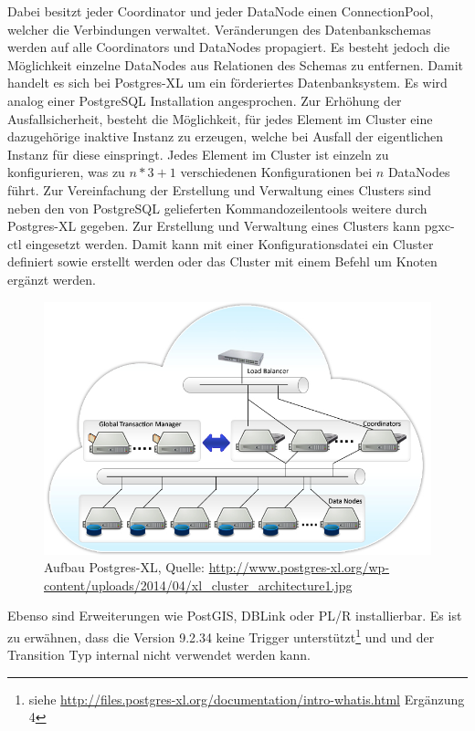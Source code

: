 Dabei besitzt jeder Coordinator und jeder DataNode einen ConnectionPool, welcher die Verbindungen verwaltet.
Veränderungen des Datenbankschemas werden auf alle Coordinators und DataNodes propagiert.
Es besteht jedoch die Möglichkeit einzelne DataNodes aus Relationen des Schemas zu entfernen.
Damit handelt es sich bei Postgres-XL um ein förderiertes Datenbanksystem.
Es wird analog einer PostgreSQL Installation angesprochen.
Zur Erhöhung der Ausfallsicherheit, besteht die Möglichkeit, für jedes Element im Cluster eine dazugehörige inaktive Instanz zu erzeugen, welche bei Ausfall der eigentlichen Instanz für diese einspringt.
Jedes Element im Cluster ist einzeln zu konfigurieren, was zu $ n*3+1 $ verschiedenen Konfigurationen bei $n$ DataNodes führt.
Zur Vereinfachung der Erstellung und Verwaltung eines Clusters sind neben den von PostgreSQL gelieferten Kommandozeilentools weitere durch Postgres-XL gegeben.
Zur Erstellung und Verwaltung eines Clusters kann pgxc-ctl eingesetzt werden.
Damit kann mit einer Konfigurationsdatei ein Cluster definiert sowie erstellt werden oder das Cluster mit einem Befehl um Knoten ergänzt werden.
\begin{figure}[h!]
\centering
\includegraphics[width=.7\textwidth]{Abbildungen/postgresxl-structure.jpg}
\caption[Aufbau Postgres-XL]{Aufbau Postgres-XL, Quelle: \url{http://www.postgres-xl.org/wp-content/uploads/2014/04/xl_cluster_architecture1.jpg}}
\label{fig:postgresxl}
\end{figure}
Ebenso sind Erweiterungen wie PostGIS, DBLink oder PL/R installierbar.
Es ist zu erwähnen, dass die Version 9.2.34 keine Trigger unterstützt\footnote{siehe \url{http://files.postgres-xl.org/documentation/intro-whatis.html} Ergänzung 4} und und der Transition Typ internal nicht verwendet werden kann.

